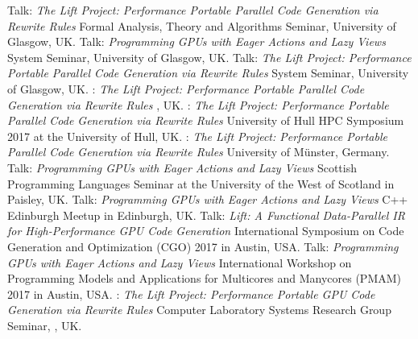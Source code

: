          {Talk: \emph{The Lift Project: Performance Portable Parallel Code Generation via Rewrite Rules}\newline
         \small Formal Analysis, Theory and Algorithms Seminar, University of Glasgow, UK.}
         {Talk: \emph{Programming GPUs with Eager Actions and Lazy Views}\newline
         \small System Seminar, University of Glasgow, UK.}
         {Talk: \emph{The Lift Project: Performance Portable Parallel Code Generation via Rewrite Rules}\newline
         \small System Seminar, University of Glasgow, UK.}
         {:
          \emph{The Lift Project: Performance Portable Parallel Code Generation via Rewrite Rules}\newline
         \small {}, UK.}
         {:\newline
          \emph{The Lift Project: Performance Portable Parallel Code Generation via Rewrite Rules}\newline
         \small University of Hull HPC Symposium 2017 at the University of Hull, UK.}
         {:\newline
          \emph{The Lift Project: Performance Portable Parallel Code Generation via Rewrite Rules}\newline
         \small University of Münster, Germany.}
         {Talk: \emph{Programming GPUs with Eager Actions and Lazy Views}\newline
         \small Scottish Programming Languages Seminar at the University of the West of Scotland in Paisley, UK.}
         {Talk: \emph{Programming GPUs with Eager Actions and Lazy Views}\newline
         \small C++ Edinburgh Meetup in Edinburgh, UK.}
         {Talk: \emph{Lift: A Functional Data-Parallel IR for High-Performance GPU Code Generation}\newline
          \small International Symposium on Code Generation and Optimization (CGO) 2017 in Austin, USA.}
         {Talk: \emph{Programming GPUs with Eager Actions and Lazy Views}\newline
          \small  International Workshop on Programming Models and Applications for Multicores and Manycores (PMAM) 2017 in Austin, USA.}
         {: \emph{The Lift Project: Performance Portable GPU Code Generation via Rewrite Rules}\newline
         Computer Laboratory Systems Research Group Seminar, , UK.
         }
